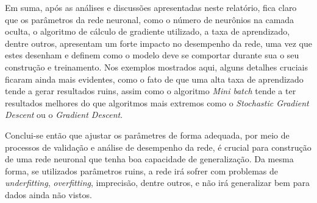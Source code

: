 \documentclass{article}
\begin{document}
Em suma, após as análises e discussões apresentadas neste relatório, fica claro que os parâmetros da rede neuronal, como o número de neurônios na camada oculta,
o algoritmo de cálculo de gradiente utilizado, a taxa de aprendizado, dentre outros, apresentam um forte impacto no desempenho da rede, uma vez que estes desenham e definem como 
o modelo deve se comportar durante sua o seu construção e treinamento. Nos exemplos mostrados aqui, alguns detalhes cruciais ficaram ainda mais evidentes, como o fato de que
uma alta taxa de aprendizado tende a gerar resultados ruins, assim como o algoritmo \textit{Mini batch} tende a ter resultados melhores do que algoritmos mais extremos como o
\textit{Stochastic Gradient Descent} ou o \textit{Gradient Descent}.

Conclui-se então que ajustar os parâmetres de forma adequada, por meio de processos de validação e análise de desempenho da rede, é crucial para construção de uma rede neuronal que tenha
boa capacidade de generalização. Da mesma forma, se utilizados parâmetros ruins, a rede irá sofrer com problemas de \textit{underfitting}, \textit{overfitting}, imprecisão, dentre outros, e não irá
generalizar bem para dados ainda não vistos.
\end{document}
